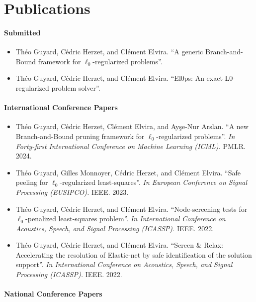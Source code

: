 \section{Publications}

\paragraph*{Submitted}

\begin{itemize}[nosep]
    \item Théo Guyard, Cédric Herzet, and Clément Elvira. ``A generic Branch-and-Bound framework for $\ell_0$-regularized problems''.
    \item Théo Guyard, Cédric Herzet, and Clément Elvira. ``El0ps: An exact L0-regularized problem solver''.
\end{itemize}

\paragraph*{International Conference Papers}

\begin{itemize}
    \item Théo Guyard, Cédric Herzet, Clément Elvira, and Ay\c{s}e-Nur Arslan. ``A new Branch-and-Bound pruning framework for $\ell_0$-regularized problems''. \textit{In Forty-first International Conference on Machine Learning (ICML).} PMLR. 2024.
    \item Théo Guyard, Gilles Monnoyer, Cédric Herzet,  and Clément Elvira. ``Safe peeling for $\ell_0$-regularized least-squares''. \textit{In European Conference on Signal Processing (EUSIPCO).} IEEE. 2023.
    \item Théo Guyard, Cédric Herzet, and Clément Elvira. ``Node-screening tests for $\ell_0$-penalized least-squares problem''. \textit{In International Conference on Acoustics, Speech, and Signal Processing (ICASSP).} IEEE. 2022.
    \item Théo Guyard, Cédric Herzet, and Clément Elvira. ``Screen \& Relax: Accelerating the resolution of Elastic-net by safe identification of the solution support''. \textit{In International Conference on Acoustics, Speech, and Signal Processing (ICASSP).} IEEE. 2022.
\end{itemize}

\paragraph*{National Conference Papers}

